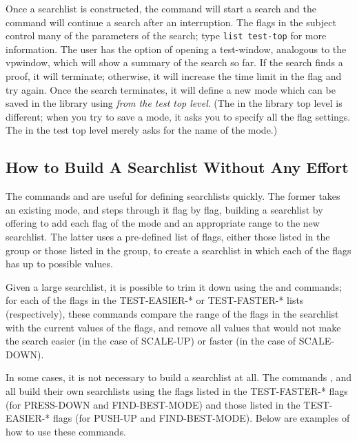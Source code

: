 Once a searchlist is constructed, the  command will start a search
and the  command will continue a search after an interruption.
The flags in the subject  control many of the parameters of the
search; type {\tt list test-top} for more information. The user has the option of opening
a test-window, analogous to the vpwindow, which will show a summary of the search so far.
If the search finds a proof, it will terminate; otherwise, it will increase the time limit
in the flag  and try again. Once the search terminates,
it will define a new mode which can be saved in the library using 
{\it from the test top level}. (The  in the library top level is different;
when you try to save a mode, it asks you to specify all the flag settings. The 
in the test top level merely asks for the name of the mode.)

\subsection{How to Build A Searchlist Without Any Effort}

The commands  and  are
useful for defining searchlists quickly. The former takes an existing mode,
and steps through it flag by flag, building a searchlist by offering to
add each flag of the mode and an appropriate range to the new searchlist.
The latter uses a pre-defined list of flags, either those listed in the
 group or those listed in the 
group, to create a searchlist in which each of the flags has up to
 possible values.

Given a large searchlist, it is possible to trim it down using the 
and  commands; for each of the flags in the TEST-EASIER-* or TEST-FASTER-*
lists (respectively), these commands compare the range of the flags in the
searchlist with the current values of the flags, and remove all values that would not make the
search easier (in the case of SCALE-UP) or faster (in the case of SCALE-DOWN).

In some cases, it is not necessary to build a searchlist at all. The commands ,
 and  all build their own searchlists
using the flags listed in the TEST-FASTER-* flags (for PRESS-DOWN and FIND-BEST-MODE)
and those listed in the TEST-EASIER-* flags (for PUSH-UP and FIND-BEST-MODE). Below are
examples of how to use these commands.

